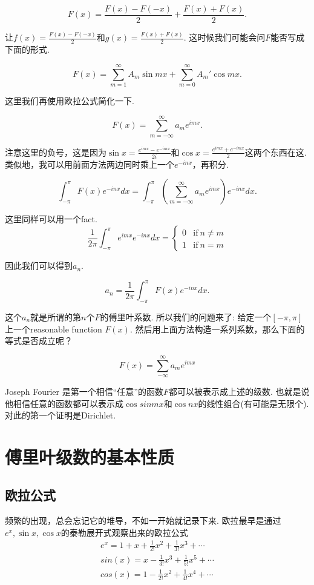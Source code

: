 \documentclass{article}
\begin{document}
$$
F(x) = \frac{F(x)-F(-x)}{2} +\frac{F(x)+F(x)}{2}.
$$

让$f(x) = \frac{F(x)-F(-x)}{2} $和$g(x) = \frac{F(x)+F(x)}{2}$. 这时候我们可能会问$F$能否写成下面的形式.

$$
F(x) = \sum\limits_{m=1}^\infty A_m\sin mx + \sum\limits_{m=0}^{\infty} A_m' \cos mx.
$$

这里我们再使用欧拉公式简化一下.

$$
F(x) = \sum\limits_{m=-\infty}^\infty a_me^{imx}.
$$

注意这里的负号，这是因为$\sin x = \frac{e^{imx}-e^{-imx}}{2i}$和$\cos x = \frac{e^{imx} + e^{-imx}}{2}$这两个东西在这. 类似地，我可以用前面方法两边同时乘上一个$e^{-inx}$，再积分.

$$
	\int_{-\pi}^{\pi} F(x)e^{-inx}dx = \int_{-\pi}^{\pi} \left( \sum\limits_{m=-\infty}^\infty a_me^{imx} \right)e^{-inx}dx.
$$

这里同样可以用一个fact.
$$
\frac{1}{2\pi} \int_{-\pi}^{\pi} e^{imx}e^{-inx} dx =\left\{ \begin{array}{lc}
0 & \text{if}\ n \neq m \\
1 & \text{if}\ n = m
\end{array} \right.
$$

因此我们可以得到$a_n$.

$$
	a_n = \frac{1}{2\pi} \int_{-\pi}^{\pi} F(x)e^{-inx}dx.
$$

这个$a_n$就是所谓的第$n$个$F$的傅里叶系数. 所以我们的问题来了: 给定一个$[-\pi,\pi]$上一个reasonable function $F(x)$. 然后用上面方法构造一系列系数，那么下面的等式是否成立呢？

$$
F(x) = \sum\limits_{-\infty}^{\infty} a_me^{imx}
$$

Joseph Fourier 是第一个相信“任意”的函数$F$都可以被表示成上述的级数. 也就是说他相信任意的函数都可以表示成$\cos sin mx$和$\cos nx$的线性组合(有可能是无限个). 对此的第一个证明是Dirichlet.

\newpage
\section{傅里叶级数的基本性质}

\subsection{欧拉公式}
频繁的出现，总会忘记它的堆导，不如一开始就记录下来.
欧拉最早是通过$e^x,\sin x ,\cos x$的泰勒展开式观察出来的欧拉公式
\begin{align*}
e^ x =1+x+\frac{1}{2!}x^2+\frac{1}{3!}x^3+\cdots \\
sin(x)=x-\frac{1}{3!}x^3+\frac{1}{5!}x^5+\cdots \\
cos(x)=1-\frac{1}{2!}x^2+\frac{1}{4!}x^4+\cdots
\end{align*}
\end{document}
